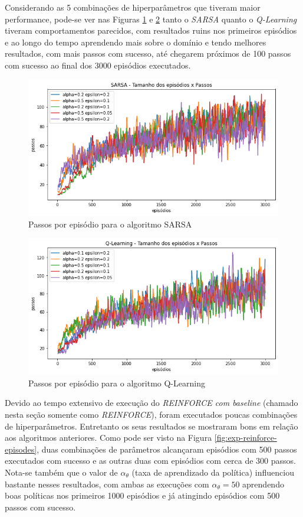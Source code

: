 \documentclass[letterpaper]{article}
\begin{document}
Considerando as 5 combinações de hiperparâmetros que tiveram maior performance, pode-se ver nas Figuras \ref{fig:exp-sarsa-episodes} e \ref{fig:exp-qlearning-episodes} tanto o \textit{SARSA} quanto o \textit{Q-Learning} tiveram comportamentos parecidos, com resultados ruins nos primeiros episódios e ao longo do tempo aprendendo mais sobre o domínio e tendo melhores resultados, com mais passos com sucesso, até chegarem próximos de 100 passos com sucesso ao final dos 3000 episódios executados.

\begin{figure}[t]
  \centering
  \includegraphics[width=0.9\columnwidth]{exp-sarsa-episodes}
  \caption{Passos por episódio para o algoritmo SARSA}
  \label{fig:exp-sarsa-episodes}
\end{figure}

\begin{figure}[t]
  \centering
  \includegraphics[width=0.9\columnwidth]{exp-qlearning-episodes}
  \caption{Passos por episódio para o algoritmo Q-Learning}
  \label{fig:exp-qlearning-episodes}
\end{figure}

Devido ao tempo extensivo de execução do \textit{REINFORCE com baseline} (chamado nesta seção somente como \textit{REINFORCE}), foram executados poucas combinações de hiperparâmetros. Entretanto os seus resultados se mostraram bons em relação aos algoritmos anteriores. Como pode ser visto na Figura \ref{fig:exp-reinforce-episodes}, duas combinações de parâmetros alcançaram episódios com 500 passos executados com sucesso e as outras duas com episódios com cerca de 300 passos. Nota-se também que o valor de $\alpha_{\theta}$ (taxa de aprendizado da política) influenciou bastante nesses resultados, com ambas as execuções com $\alpha_{\theta} = 50$ aprendendo boas políticas nos primeiros 1000 episódios e já atingindo episódios com 500 passos com sucesso.
\end{document}

